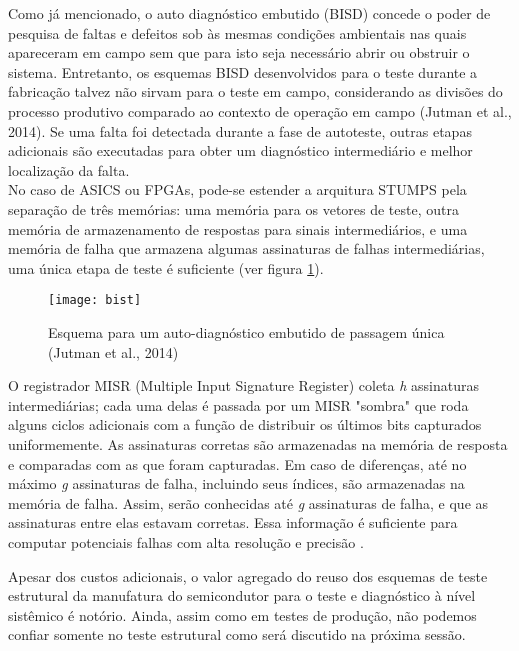 Como já mencionado, o auto diagnóstico embutido (BISD) concede o poder de pesquisa de faltas e defeitos sob às mesmas condições ambientais nas quais apareceram em campo sem que para isto seja necessário abrir ou obstruir o sistema. Entretanto, os esquemas BISD desenvolvidos para o teste durante a fabricação talvez não sirvam para o teste em campo, considerando as divisões do processo produtivo comparado ao contexto de operação em campo (Jutman et al., 2014). Se uma falta foi detectada durante a fase de autoteste, outras etapas adicionais são executadas para obter um diagnóstico intermediário e melhor localização da falta. \citep{cheng2007signature, wohl2002effective}\\

No caso de ASICS ou FPGAs, pode-se estender a arquitura STUMPS pela separação de três memórias: uma memória para os vetores de teste, outra memória de armazenamento de respostas para sinais intermediários, e uma memória de falha que armazena algumas assinaturas de falhas intermediárias, uma única etapa de teste é suficiente (ver figura \ref{fig:singlepass}).
\begin{figure}
    \centering
    \texttt{[image: bist]}
    \caption{Esquema para um auto-diagnóstico embutido de passagem única (Jutman et al., 2014)}
    \label{fig:singlepass}
\end{figure}
O registrador MISR (Multiple Input Signature Register) coleta \textit{h} assinaturas intermediárias; cada uma delas é passada por um MISR "sombra" que roda alguns ciclos adicionais com a função de distribuir os últimos bits capturados uniformemente. As assinaturas corretas são armazenadas na memória de resposta e comparadas com as que foram capturadas. Em caso de diferenças, até no máximo \textit{g} assinaturas de falha, incluindo seus índices, são armazenadas na memória de falha. Assim, serão conhecidas até \textit{g} assinaturas de falha, e que as assinaturas entre elas estavam corretas. Essa informação é suficiente para computar potenciais falhas com alta resolução e precisão \citep{cook2014diagnosis}.

Apesar dos custos adicionais, o valor agregado do reuso dos esquemas de teste estrutural da manufatura do semicondutor para o teste e diagnóstico à nível sistêmico é notório. Ainda, assim como em testes de produção, não podemos confiar somente no teste estrutural como será discutido na próxima sessão.  